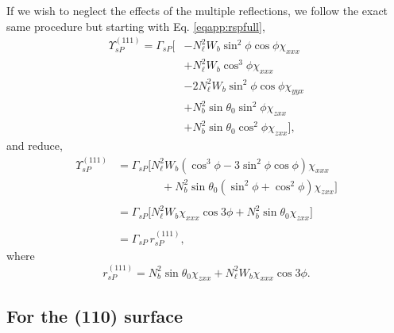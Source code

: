 If we wish to neglect the effects of the multiple reflections, we follow the
exact same procedure but starting with Eq. \eqref{eqapp:rspfull},
\begin{equation*}
\begin{split}
\Upsilon^{(111)}_{sP} =
\Gamma_{sP}
\big[
&- N^{2}_{\ell}W_{b}\sin^{2}\phi\cos\phi\chi_{xxx}\\
&+ N^{2}_{\ell}W_{b}\cos^{3}\phi\chi_{xxx}\\
&- 2N^{2}_{\ell}W_{b}\sin^{2}\phi\cos\phi\chi_{yyx}\\
&+ N^{2}_{b}\sin\theta_{0}\sin^{2}\phi\chi_{zxx}\\
&+ N^{2}_{b}\sin\theta_{0}\cos^{2}\phi\chi_{zxx}
\big],
\end{split}
\end{equation*}
and reduce,
\begin{equation*}
\begin{split}
\Upsilon^{(111)}_{sP} &=
\Gamma_{sP}
\big[
N^{2}_{\ell}W_{b}(\cos^{3}\phi - 3\sin^{2}\phi\cos\phi)\chi_{xxx}\\
&\qquad\qquad+ N^{2}_{b}\sin\theta_{0}(\sin^{2}\phi + \cos^{2}\phi)\chi_{zxx}
\big]\\\\
&=
\Gamma_{sP}
\big[
N^{2}_{\ell}W_{b}\chi_{xxx}\cos3\phi + N^{2}_{b}\sin\theta_{0}\chi_{zxx}
\big]\\\\
&= \Gamma_{sP}\,r^{(111)}_{sP},
\end{split}
\end{equation*}
where
\begin{equation}\label{eqapp:final-rsp.111}
r^{(111)}_{sP} = 
N^{2}_{b}\sin\theta_{0}\chi_{zxx} + N^{2}_{\ell}W_{b}\chi_{xxx}\cos3\phi.
\end{equation}


\subsection{For the (110) surface}

